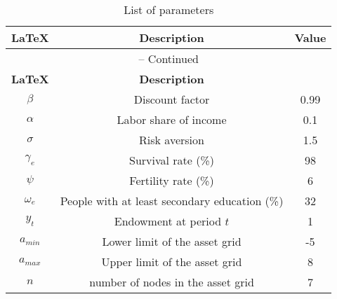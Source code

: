 \begin{center}
\begin{longtable}{ccc}
\caption{List of parameters}\\%
\hline%
\multicolumn{1}{c}{\textbf{\LaTeX}} &
\multicolumn{1}{c}{\textbf{Description}} &
\multicolumn{1}{c}{\textbf{Value}}\\%
\hline\hline%
\endfirsthead
\multicolumn{3}{c}{{\tablename} \thetable{} -- Continued}\\%
\hline%
\multicolumn{1}{c}{\textbf{\LaTeX}} &
\multicolumn{1}{c}{\textbf{Description}}\\%
\hline\hline%
\endhead
${\beta}$ & Discount factor & 0.99\\
${\alpha}$ & Labor share of income & 0.1\\
${\sigma}$ & Risk aversion & 1.5 \\
${\gamma_{e}}$ & Survival rate (\%) & 98\\
${\psi}$ & Fertility rate (\%) & 6\\
${\omega_{e}}$ & People with at least secondary education (\%) & 32\\
${y_{t}}$ & Endowment at period $t$ & 1\\
$a_{min}$ & Lower limit of the asset grid & -5 \\
$a_{max}$ & Upper limit of the asset grid & 8\\
$n$ & number of nodes in the asset grid& 7\\

\hline%
\end{longtable}
\end{center}